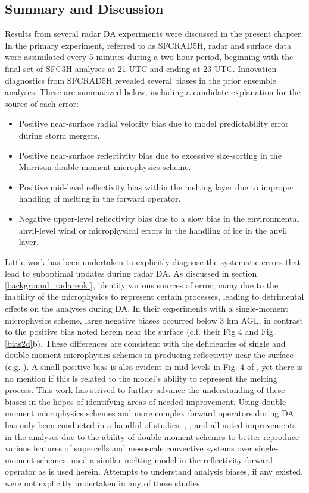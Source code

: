 \subsection{Summary and Discussion}
Results from several radar DA experiments were discussed in the present chapter. In the primary experiment, referred to as SFCRAD5H, radar and surface data were assimilated every 5-minutes during a two-hour period, beginning with the final set of SFC3H analyses at 21 UTC and ending at 23 UTC. Innovation diagnostics from SFCRAD5H revealed several biases in the prior ensemble analyses. These are summarized below, including a candidate explanation for the source of each error:

\begin{itemize}
\item Positive near-surface radial velocity bias due to model predictability error during storm mergers.
\item Positive near-surface reflectivity bias due to excessive size-sorting in the Morrison double-moment microphysics scheme.
\item Positive mid-level reflectivity bias within the melting layer due to improper handling of melting in the forward operator.
\item Negative upper-level reflectivity bias due to a slow bias in the environmental anvil-level wind or microphysical errors in the handling of ice in the anvil layer.
\end{itemize}

Little work has been undertaken to explicitly diagnose the systematic errors that lead to suboptimal updates during radar DA. As discussed in section \ref{background_radarenkf}, \citet{dowelletal11} identify various sources of error, many due to the inability of the microphysics to represent certain processes, leading to detrimental effects on the analyses during DA. In their experiments with a single-moment microphysics scheme, large negative biases occurred below 3 km AGL, in contrast to the positive bias noted herein near the surface (c.f. their Fig 4 and Fig. \ref{bias2d}b). These differences are consistent with the deficiencies of single and double-moment microphysics schemes in producing reflectivity near the surface (e.g. \citealt{dawsonetal10,kumjianryzhkov12}). A small positive bias is also evident in mid-levels in Fig. 4 of \citet{dowelletal11}, yet there is no mention if this is related to the model's ability to represent the melting process. This work has strived to further advance the understanding of these biases in the hopes of identifying areas of needed improvement. Using double-moment microphysics schemes and more complex forward operators during DA has only been conducted in a handful of studies. \citet{jungetal12}, \citet{putnametal13}, and \citet{yussoufetal13} all noted improvements in the analyses due to the ability of double-moment schemes to better reproduce various features of supercells and mesoscale convective systems over single-moment schemes. \citet{jungetal12} used a similar melting model in the reflectivity forward operator as is used herein. Attempts to understand analysis biases, if any existed, were not explicitly undertaken in any of these studies.

